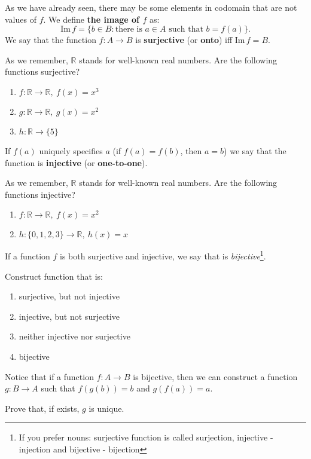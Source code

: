 \noindent As we have already seen, there may be some elements in codomain that are not values of
$f$. We define \textbf{the image of $f$} as:
$$\text{Im}\, f = \{b\in B : \text{there is } a\in A \text{ such that } b=f(a)\}.$$
We say that the function $f: A\to B$ is \textbf{surjective} (or \textbf{onto}) iff $\text{Im}\,f=B$.

\begin{prob}
	As we remember, $\mathbb{R}$ stands for well-known real numbers. Are the following functions surjective?
	\begin{enumerate}
		\item $f: \mathbb{R} \to \mathbb{R}, ~f(x)=x^3$
		\item $g: \mathbb{R} \to \mathbb{R}, ~g(x)=x^2$
		\item $h: \mathbb{R} \to \{5\}$
	\end{enumerate}
\end{prob}

If $f(a)$ uniquely specifies $a$ (if $f(a)=f(b)$, then $a=b$) we say that the function is \textbf{injective}
(or \textbf{one-to-one}).
\begin{prob}
	As we remember, $\mathbb{R}$ stands for well-known real numbers. Are the following functions injective?
	\begin{enumerate}
		\item $f: \mathbb{R} \to \mathbb R, ~f(x)=x^2$
		\item $h: \{0,1,2,3\} \to \mathbb R, ~h(x)=x$
	\end{enumerate}
\end{prob}

If a function $f$ is both surjective and injective, we say that is \textit{bijective}\footnote{If you prefer nouns: surjective function is called surjection, injective - injection
and bijective - bijection}.

\begin{prob}
	Construct function that is:
	\begin{enumerate}
		\item surjective, but not injective
		\item injective, but not surjective
		\item neither injective nor surjective
		\item bijective
	\end{enumerate}
\end{prob}

\noindent Notice that if a function $f: A\to B$ is bijective, then we can construct a function $g:B\to A$
such that $f(g(b))=b$ and $g(f(a))=a$.
\begin{prob}
	Prove that, if exists, $g$ is unique.
\end{prob}

